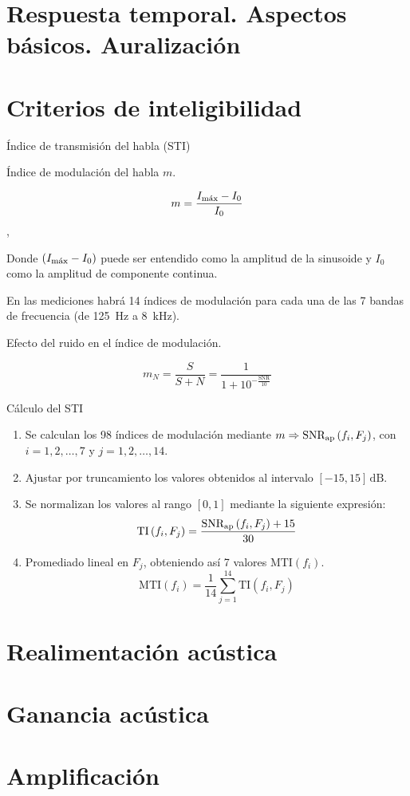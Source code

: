 \documentclass[10pt]{book}
\begin{document}
\section{Respuesta temporal. Aspectos básicos. Auralización}
\section{Criterios de inteligibilidad}

Índice de transmisión del habla (STI)

Índice de modulación del habla $m$.

\begin{equation} \label{eq:indice_modulacion_habla}
	m = \frac{I _{\textnormal{máx}} - I_0}{I_0}
\end{equation},

Donde $(I _{\textnormal{máx}} - I_0)$ puede ser entendido como la amplitud de la sinusoide y $I_0$ como la amplitud de componente continua.

En las mediciones habrá 14 índices de modulación para cada una de las 7 bandas de frecuencia (de \qty{125}{\hertz } a \qty{8}{\kilo\hertz}).

Efecto del ruido en el índice de modulación.

\begin{equation} \label{eq:indice_modulacion_ruido}
	m_N = \frac{S}{S + N} = \frac{1}{1 + 10 ^{-\frac{\text{SNR}}{10}}}
\end{equation}

Cálculo del STI

\begin{enumerate}
	\item Se calculan los 98 índices de modulación mediante $m \Rightarrow \text{SNR} _{\textnormal{ap}} \left( f_i, F_j \right) $, con $i = {1,2, \ldots ,7}$ y $j = {1,2, \ldots, 14}$.
	\item Ajustar por truncamiento los valores  obtenidos al intervalo $[-15, 15]\, \unit{\dB} $.
	\item Se normalizan los valores al rango $[0, 1]$ mediante la siguiente expresión:
	      \begin{equation}
		      \text{TI} \left( f_i, F_j \right) = \frac{\text{SNR} _{\textnormal{ap}} \left( f_i, F_j \right)  + 15}{30}
	      \end{equation}
	\item Promediado lineal en $F_j$, obteniendo así 7 valores $\text{MTI}(f_i)$.
	      \begin{equation}
		      \text{MTI}(f_i) = \frac{1}{14} \sum_{j=1}^{14} \text{TI} \left( f_i, F_j \right)
	      \end{equation}
\end{enumerate}

\section{Realimentación acústica}
\section{Ganancia acústica}
\section{Amplificación}
\end{document}
